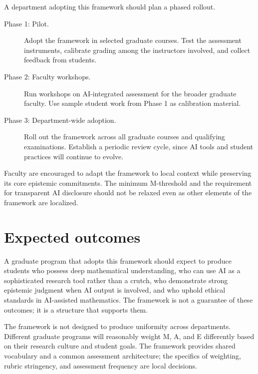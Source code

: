 \documentclass{SIAMbook2023}
\begin{document}
A department adopting this framework should plan a phased rollout.

\begin{description}
\item[Phase 1: Pilot.] Adopt the framework in selected graduate courses. Test the assessment instruments, calibrate grading among the instructors involved, and collect feedback from students.
\item[Phase 2: Faculty workshops.] Run workshops on AI-integrated assessment for the broader graduate faculty. Use sample student work from Phase 1 as calibration material.
\item[Phase 3: Department-wide adoption.] Roll out the framework across all graduate courses and qualifying examinations. Establish a periodic review cycle, since AI tools and student practices will continue to evolve.
\end{description}

Faculty are encouraged to adapt the framework to local context while preserving its core epistemic commitments. The minimum M-threshold and the requirement for transparent AI disclosure should not be relaxed even as other elements of the framework are localized.

\section{Expected outcomes}

A graduate program that adopts this framework should expect to produce students who possess deep mathematical understanding, who can use AI as a sophisticated research tool rather than a crutch, who demonstrate strong epistemic judgment when AI output is involved, and who uphold ethical standards in AI-assisted mathematics. The framework is not a guarantee of these outcomes; it is a structure that supports them.

The framework is not designed to produce uniformity across departments. Different graduate programs will reasonably weight M, A, and E differently based on their research culture and student goals. The framework provides shared vocabulary and a common assessment architecture; the specifics of weighting, rubric stringency, and assessment frequency are local decisions.

\newpage

\end{document}
